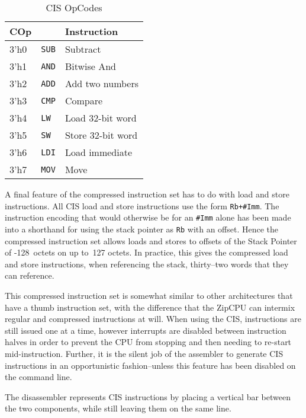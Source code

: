 \documentclass{gqtekspec}
\begin{document}
\begin{table}\begin{center}
\begin{tabular}{|l|l|l|} \hline \rowcolor[gray]{0.85}
COp & & Instruction \\\hline\hline
3'h0 & {\tt SUB} & Subtract   \\\hline
3'h1 & {\tt AND} & Bitwise And   \\\hline
3'h2 & {\tt ADD} & Add two numbers   \\\hline
3'h3 & {\tt CMP}  & Compare \\\hline
3'h4 & {\tt LW} & Load 32-bit word\\\hline
3'h5 & {\tt SW} & Store 32-bit word\\\hline
3'h6 & {\tt LDI} & Load immediate\\\hline
3'h7 & {\tt MOV} & Move\\\hline
\end{tabular}
\caption{CIS OpCodes}\label{tbl:iset-cisops}
\end{center}\end{table}

A final feature of the compressed instruction set has to do with load and
store instructions.  All CIS load and store instructions use the form
{\tt Rb+\#Imm}.  The instruction encoding that would otherwise be for
an {\tt \#Imm} alone has been made into a shorthand for using the stack pointer
as {\tt Rb} with an offset.  Hence the compressed instruction set allows loads
and stores to offsets of the Stack Pointer of -128~octets on up to~127 octets.
In practice, this gives the compressed load and store instructions, when
referencing the stack, thirty--two words that they can reference.

This compressed instruction set is somewhat similar to other architectures that
have a thumb instruction set, with the difference that the ZipCPU can intermix
regular and compressed instructions at will.  When using the CIS, instructions
are still issued one at a time, however interrupts are disabled between
instruction halves in order to prevent the CPU from stopping and then needing
to re-start mid-instruction.  Further, it is the silent job of the assembler
to generate CIS instructions in an opportunistic fashion--unless this feature
has been disabled on the command line.

The disassembler represents CIS instructions by placing a vertical bar
between the two components, while still leaving them on the same line.
\end{document}

